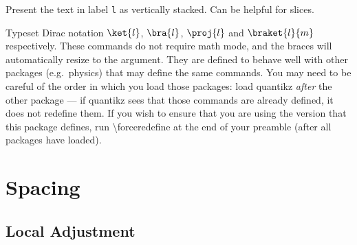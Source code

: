 \documentclass[aps,pra,10pt,nofootinbib]{revtex4-2}
\begin{document}
\begin{description}[style=nextline]
  \item [\textbackslash verticaltext\{l\}]
        Present the text in label \texttt{l} as vertically stacked. Can be helpful for slices.

  \item [\textbackslash ket\{l\}, \textbackslash bra\{l\}, \textbackslash proj\{l\}, \textbackslash braket\{l\}\{m\}]
        Typeset Dirac notation $\ket{l}$, $\bra{l}$, $\proj{l}$ and $\braket{l}{m}$ respectively. These commands do not require math mode, and the braces will automatically resize to the argument. They are defined to behave well with other packages (e.g.\ physics) that may define the same commands. You may need to be careful of the order in which you load those packages: load quantikz \emph{after} the other package --- if quantikz sees that those commands are already defined, it does not redefine them. If you wish to ensure that you are using the version that this package defines, run \textbackslash forceredefine at the end of your preamble (after all packages have loaded).

\end{description}







\section{Spacing}\label{sec:spacing}

\subsection{Local Adjustment}
\end{document}
